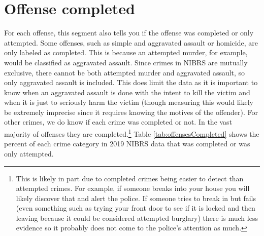 \documentclass[
]{krantz}
\begin{document}
\section{Offense completed}\label{offense-completed}

For each offense, this segment also tells you if the offense
was completed or only attempted. Some offenses, such as
simple and aggravated assault or homicide, are only labeled
as completed. This is because an attempted murder, for
example, would be classified as aggravated assault. Since
crimes in NIBRS are mutually exclusive, there cannot be both
attempted murder and aggravated assault, so only aggravated
assault is included. This does limit the data as it is
important to know when an aggravated assault is done with
the intent to kill the victim and when it is just to
seriously harm the victim (though measuring this would
likely be extremely imprecise since it requires knowing the
motives of the offender). For other crimes, we do know if
each crime was completed or not. In the vast majority of
offenses they are completed.\footnote{This is likely in part
  due to completed crimes being easier to detect than
  attempted crimes. For example, if someone breaks into your
  house you will likely discover that and alert the police.
  If someone tries to break in but fails (even something
  such as trying your front door to see if it is locked and
  then leaving because it could be considered attempted
  burglary) there is much less evidence so it probably does
  not come to the police's attention as much.} Table
\ref{tab:offensesCompleted} shows the percent of each crime
category in 2019 NIBRS data that was completed or was only
attempted.
\end{document}
